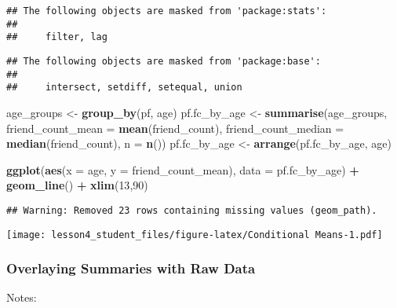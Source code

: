 \documentclass[]{article}
\newenvironment{Shaded}{\begin{snugshade}}{\end{snugshade}}
\newcommand{\KeywordTok}[1]{\textcolor[rgb]{0.13,0.29,0.53}{\textbf{#1}}}
\newcommand{\DataTypeTok}[1]{\textcolor[rgb]{0.13,0.29,0.53}{#1}}
\newcommand{\DecValTok}[1]{\textcolor[rgb]{0.00,0.00,0.81}{#1}}
\newcommand{\StringTok}[1]{\textcolor[rgb]{0.31,0.60,0.02}{#1}}
\newcommand{\OperatorTok}[1]{\textcolor[rgb]{0.81,0.36,0.00}{\textbf{#1}}}
\newcommand{\NormalTok}[1]{#1}
\begin{document}
\begin{verbatim}
## The following objects are masked from 'package:stats':
## 
##     filter, lag
\end{verbatim}

\begin{verbatim}
## The following objects are masked from 'package:base':
## 
##     intersect, setdiff, setequal, union
\end{verbatim}

\begin{Shaded}
\begin{Highlighting}[]
\NormalTok{age_groups <-}\StringTok{ }\KeywordTok{group_by}\NormalTok{(pf, age)}
\NormalTok{pf.fc_by_age <-}\StringTok{ }\KeywordTok{summarise}\NormalTok{(age_groups,}
          \DataTypeTok{friend_count_mean =} \KeywordTok{mean}\NormalTok{(friend_count),}
          \DataTypeTok{friend_count_median =} \KeywordTok{median}\NormalTok{(friend_count),}
          \DataTypeTok{n =} \KeywordTok{n}\NormalTok{())}
\NormalTok{pf.fc_by_age <-}\StringTok{ }\KeywordTok{arrange}\NormalTok{(pf.fc_by_age, age)}

\KeywordTok{ggplot}\NormalTok{(}\KeywordTok{aes}\NormalTok{(}\DataTypeTok{x =}\NormalTok{ age, }\DataTypeTok{y =}\NormalTok{ friend_count_mean), }\DataTypeTok{data =}\NormalTok{ pf.fc_by_age) }\OperatorTok{+}
\StringTok{  }\KeywordTok{geom_line}\NormalTok{() }\OperatorTok{+}
\StringTok{  }\KeywordTok{xlim}\NormalTok{(}\DecValTok{13}\NormalTok{,}\DecValTok{90}\NormalTok{)}
\end{Highlighting}
\end{Shaded}

\begin{verbatim}
## Warning: Removed 23 rows containing missing values (geom_path).
\end{verbatim}

\texttt{[image: lesson4\_student\_files/figure-latex/Conditional Means-1.pdf]}

\subsubsection{Overlaying Summaries with Raw
Data}\label{overlaying-summaries-with-raw-data}

Notes:
\end{document}
